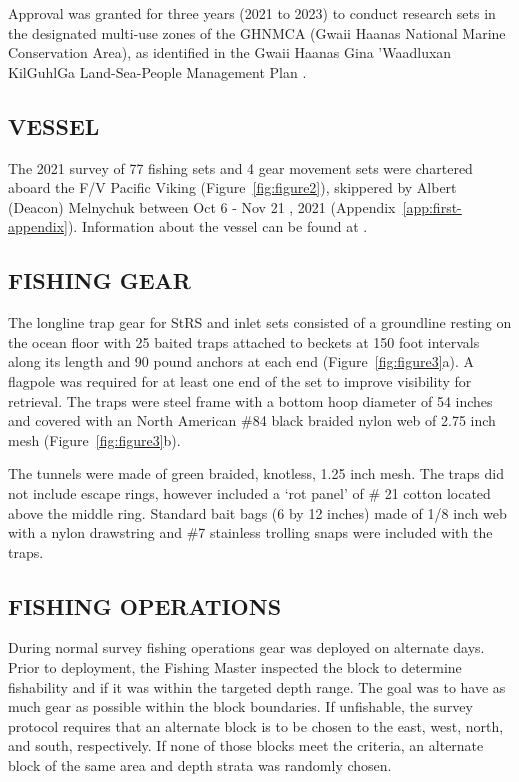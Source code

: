 \documentclass[12pt]{article}\usepackage[]{graphicx}\usepackage[]{color}
\begin{document}
Approval was granted for three years (2021 to 2023) to conduct research sets in the designated multi-use zones of the GHNMCA (Gwaii Haanas National Marine Conservation Area), as identified in the Gwaii Haanas Gina 'Waadluxan KilGuhlGa Land-Sea-People Management Plan .

\hypertarget{vessel}{%
\subsection{VESSEL}\label{vessel}}

The 2021 survey of 77 fishing sets and 4 gear movement sets were chartered aboard the F/V Pacific Viking (Figure~\ref{fig:figure2}), skippered by Albert (Deacon) Melnychuk between Oct 6 - Nov 21 , 2021 (Appendix~\ref{app:first-appendix}). Information about the vessel can be found at .

\hypertarget{fishing-gear}{%
\subsection{FISHING GEAR}\label{fishing-gear}}

The longline trap gear for StRS and inlet sets consisted of a groundline resting on the ocean floor with 25 baited traps attached to beckets at 150 foot intervals along its length and 90 pound anchors at each end (Figure~\ref{fig:figure3}a). A flagpole was required for at least one end of the set to improve visibility for retrieval. The traps were steel frame with a bottom hoop diameter of 54 inches and covered with an North American \#84 black braided nylon web of 2.75 inch mesh (Figure~\ref{fig:figure3}b).

The tunnels were made of green braided, knotless, 1.25 inch mesh. The traps did not include escape rings, however included a `rot panel' of \# 21 cotton located above the middle ring. Standard bait bags (6 by 12 inches) made of 1/8 inch web with a nylon drawstring and \#7 stainless trolling snaps were included with the traps.

\hypertarget{fishing-operations}{%
\subsection{FISHING OPERATIONS}\label{fishing-operations}}

During normal survey fishing operations gear was deployed on alternate days. Prior to deployment, the Fishing Master inspected the block to determine fishability and if it was within the targeted depth range. The goal was to have as much gear as possible within the block boundaries. If unfishable, the survey protocol requires that an alternate block is to be chosen to the east, west, north, and south, respectively. If none of those blocks meet the criteria, an alternate block of the same area and depth strata was randomly chosen.
\end{document}
